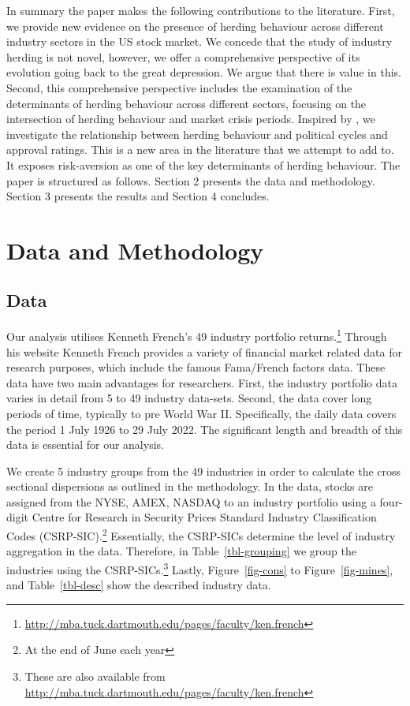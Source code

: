 \documentclass[
  letterpaper,
  DIV=11,
  numbers=noendperiod]{scrartcl}
\begin{document}
In summary the paper makes the following contributions to the
literature. First, we provide new evidence on the presence of herding
behaviour across different industry sectors in the US stock market. We
concede that the study of industry herding is not novel, however, we
offer a comprehensive perspective of its evolution going back to the
great depression. We argue that there is value in this. Second, this
comprehensive perspective includes the examination of the determinants
of herding behaviour across different sectors, focusing on the
intersection of herding behaviour and market crisis periods. Inspired by
\citet{nath2020investor}, we investigate the relationship between
herding behaviour and political cycles and approval ratings. This is a
new area in the literature that we attempt to add to. It exposes
risk-aversion as one of the key determinants of herding behaviour. The
paper is structured as follows. Section 2 presents the data and
methodology. Section 3 presents the results and Section 4 concludes.

\section{Data and Methodology}\label{data-and-methodology}

\subsection{Data}\label{data}

Our analysis utilises Kenneth French's 49 industry portfolio
returns.\footnote{\url{http://mba.tuck.dartmouth.edu/pages/faculty/ken.french}}
Through his website Kenneth French provides a variety of financial
market related data for research purposes, which include the famous
Fama/French factors data. These data have two main advantages for
researchers. First, the industry portfolio data varies in detail from 5
to 49 industry data-sets. Second, the data cover long periods of time,
typically to pre World War II. Specifically, the daily data covers the
period 1 July 1926 to 29 July 2022. The significant length and breadth
of this data is essential for our analysis.

We create 5 industry groups from the 49 industries in order to calculate
the cross sectional dispersions as outlined in the methodology. In the
data, stocks are assigned from the NYSE, AMEX, NASDAQ to an industry
portfolio using a four-digit Centre for Research in Security Prices
Standard Industry Classification Codes (CSRP-SIC).\footnote{At the end
  of June each year} Essentially, the CSRP-SICs determine the level of
industry aggregation in the data. Therefore, in Table~\ref{tbl-grouping}
we group the industries using the CSRP-SICs.\footnote{These are also
  available from
  \url{http://mba.tuck.dartmouth.edu/pages/faculty/ken.french}} Lastly,
Figure~\ref{fig-cons} to Figure~\ref{fig-mines}, and
Table~\ref{tbl-desc} show the described industry data.
\end{document}
